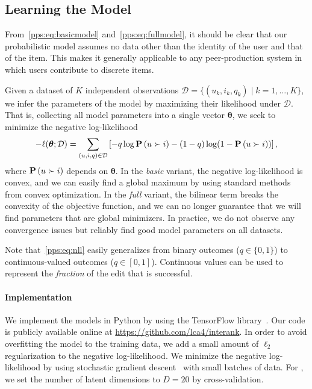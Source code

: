 \subsection{Learning the Model}
\label{pps:sec:learning}

From~\eqref{pps:eq:basicmodel} and~\eqref{pps:eq:fullmodel}, it should be clear that our probabilistic model assumes no data other than the identity of the user and that of the item.
This makes it generally applicable to any peer-production system in which users contribute to discrete items.

Given a dataset of $K$ independent observations $\mathcal{D} = \{ (u_k, i_k, q_k) \mid k = 1, \ldots, K \}$, we infer the parameters of the model by maximizing their likelihood under $\mathcal{D}$.
That is, collecting all model parameters into a single vector $\bm{\theta}$, we seek to minimize the negative log-likelihood
\begin{align}
	\label{pps:eq:nll}
	- \ell (\bm{\theta} ; \mathcal{D}) = \sum_{(u,i,q) \in \mathcal{D}} \left[ -q \log \mathbf{P}\left( u \succ i \right) - (1 - q) \log (1 - \mathbf{P}\left( u \succ i \right)) \right],
\end{align}
where $\mathbf{P}\left( u \succ i \right)$ depends on $\bm{\theta}$.
In the \emph{basic} variant, the negative log-likelihood is convex, and we can easily find a global maximum by using standard methods from convex optimization.
In the \emph{full} variant, the bilinear term breaks the convexity of the objective function, and we can no longer guarantee that we will find parameters that are global minimizers.
In practice, we do not observe any convergence issues but reliably find good model parameters on all datasets.

Note that~\eqref{pps:eq:nll} easily generalizes from binary outcomes ($q \in \{0, 1\}$) to continuous-valued outcomes ($q \in [0, 1]$).
Continuous values can be used to represent the \emph{fraction} of the edit that is successful.

\paragraph{Implementation}
We implement the models in Python by using the TensorFlow library~\citep{abadi2016tensorflow}.
Our code is publicly available online at \url{https://github.com/lca4/interank}.
In order to avoid overfitting the model to the training data, we add a small amount of $\ell_2$ regularization to the negative log-likelihood.
We minimize the negative log-likelihood by using stochastic gradient descent~\citep{bishop2006pattern} with small batches of data.
For , we set the number of latent dimensions to $D = 20$ by cross-validation.

